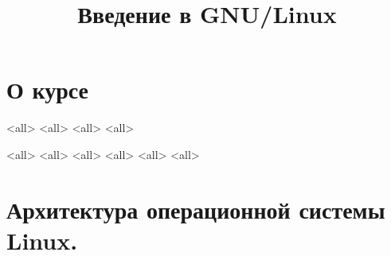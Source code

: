 

\title{Введение в GNU/Linux}




\begin{frame}
	\frametitle{}
	\titlepage
	\vspace{-0.5cm}
	\begin{center}
	\end{center}
\end{frame}


\begin{frame}
	\tableofcontents
	[hideallsubsections]
\end{frame}


\section{О курсе}

\mode<all>{}
\mode<all>{}
\mode<all>{}
\mode<all>{}

\mode<all>{}
\mode<all>{}
\mode<all>{}
\mode<all>{}
\mode<all>{}
\mode<all>{}

\section{Архитектура операционной системы Linux. }

